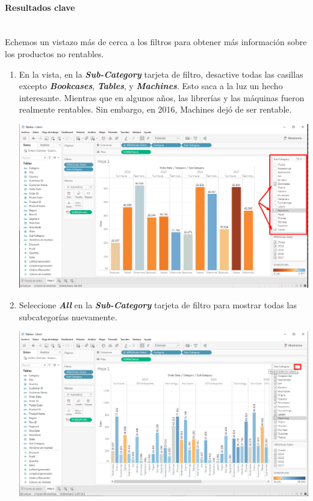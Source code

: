 \documentclass[12pt,letterpaper]{article}
\newcommand\tab[1][1cm]{\hspace*{#1}}
\begin{document}
    \paragraph{\Large Resultados clave\\ \\}
    Echemos un vistazo más de cerca a los filtros para obtener más información sobre los productos no rentables.
    \begin{enumerate}[\tab 1.]
        \item En la vista, en la \textit{\textbf{Sub-Category}} tarjeta de filtro, desactive todas las casillas excepto \textit{\textbf{Bookcases}}, \textit{\textbf{Tables}}, y \textit{\textbf{Machines}}. Esto saca a la luz un hecho interesante. Mientras que en algunos años, las librerías y las máquinas fueron realmente rentables. Sin embargo, en 2016, Machines dejó de ser rentable.
        \begin{center}
            \includegraphics[width=15cm]{./img/img22.png}
        \end{center}
        \item Seleccione \textit{\textbf{All}} en la \textit{\textbf{Sub-Category}} tarjeta de filtro para mostrar todas las subcategorías nuevamente.
        \begin{center}
            \includegraphics[width=15cm]{./img/img23.png}

\end{center}
\end{enumerate}
\end{document}
